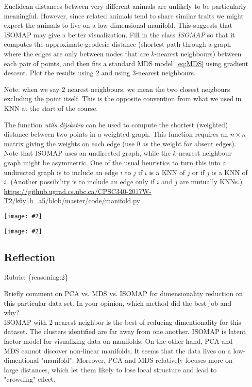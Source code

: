 \documentclass{article}
\def\rubric#1{\gre{Rubric: \{#1\}}}{}
\def\blu#1{{\color{blu}#1}}
\def\gre#1{{\color{gre}#1}}
\newcommand{\centerfig}[2]{\begin{center}\texttt{[image: \#2]}\end{center}}
\begin{document}
Euclidean distances between very different animals are unlikely to be particularly meaningful.
However, since related animals tend to share similar traits we might expect the animals to live on a low-dimensional manifold.
This suggests that ISOMAP may give a better visualization.
Fill in the class \emph{ISOMAP} so that it computes the approximate geodesic distance
(shortest path through a graph where the edges are only between nodes that are $k$-nearest neighbours) between each pair of points,
and then fits a standard MDS model~\eqref{eq:MDS} using gradient descent. \blu{Plot the results using $2$ and using $3$-nearest neighbours}.

Note: when we say $2$ nearest neighbours, we mean the two closest neigbours excluding the point itself. This is the opposite convention from what we used in KNN at the start of the course.

The function \emph{utils.dijskstra} can be used to compute the shortest (weighted) distance between two points in a weighted graph.
This function requires an $n \times n$ matrix giving the weights on each edge (use $0$ as the weight for absent edges).
Note that ISOMAP uses an undirected graph, while the $k$-nearest neighbour graph might be asymmetric.
One of the usual heuristics to turn this into a undirected graph is to include an edge $i$ to $j$ if $i$ is a KNN of $j$ or if $j$ is a KNN of $i$.
(Another possibility is to include an edge only if $i$ and $j$ are mutually KNNs.)
\gre{\url{https://github.ugrad.cs.ubc.ca/CPSC340-2017W-T2/k6y1b_a5/blob/master/code/manifold.py}}
\centerfig{.5}{../figs/ISOMAP2_animals.png}
\centerfig{.5}{../figs/ISOMAP3_animals.png}

\subsection{Reflection}
\rubric{reasoning:2}

\blu{Briefly comment on PCA vs. MDS vs. ISOMAP for dimensionality reduction on this particular data set. In your opinion, which method did the best job and why?\\
\gre{ISOMAP with 2 nearest neighbor is the best of reducing dimentionality for this dataset. The clusters identified are far away from one another. ISOMAP is latent factor model for visualizing data on manifolds. On the other hand, PCA and MDS cannot discover non-linear manifolds. It seems that the data lives on a low-dimentional "manifold". Moreover, PCA and MDS relatively focuses more on large distances, which let them likely to lose local structure and lead to "crowding" effect.}}
\end{document}
